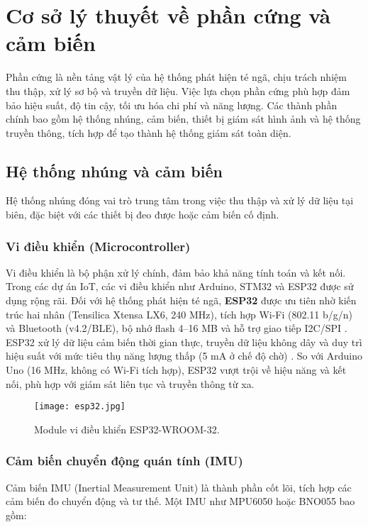 \section{Cơ sở lý thuyết về phần cứng và cảm biến}

Phần cứng là nền tảng vật lý của hệ thống phát hiện té ngã, chịu trách nhiệm thu thập, xử lý sơ bộ và truyền dữ liệu. Việc lựa chọn phần cứng phù hợp đảm bảo hiệu suất, độ tin cậy, tối ưu hóa chi phí và năng lượng. Các thành phần chính bao gồm hệ thống nhúng, cảm biến, thiết bị giám sát hình ảnh và hệ thống truyền thông, tích hợp để tạo thành hệ thống giám sát toàn diện.

\subsection{Hệ thống nhúng và cảm biến}

Hệ thống nhúng đóng vai trò trung tâm trong việc thu thập và xử lý dữ liệu tại biên, đặc biệt với các thiết bị đeo được hoặc cảm biến cố định.

\subsubsection{Vi điều khiển (Microcontroller)}
Vi điều khiển là bộ phận xử lý chính, đảm bảo khả năng tính toán và kết nối. Trong các dự án IoT, các vi điều khiển như Arduino, STM32 và ESP32 được sử dụng rộng rãi. Đối với hệ thống phát hiện té ngã, \textbf{ESP32} được ưu tiên nhờ kiến trúc hai nhân (Tensilica Xtensa LX6, 240 MHz), tích hợp Wi-Fi (802.11 b/g/n) và Bluetooth (v4.2/BLE), bộ nhớ flash 4--16 MB và hỗ trợ giao tiếp I2C/SPI \cite{esp32datasheet2023}. ESP32 xử lý dữ liệu cảm biến thời gian thực, truyền dữ liệu không dây và duy trì hiệu suất với mức tiêu thụ năng lượng thấp (5 mA ở chế độ chờ) \cite{iotproject2024}. So với Arduino Uno (16 MHz, không có Wi-Fi tích hợp), ESP32 vượt trội về hiệu năng và kết nối, phù hợp với giám sát liên tục và truyền thông từ xa.

\begin{figure}[ht]
    \centering
    \texttt{[image: esp32.jpg]}
    \caption{Module vi điều khiển ESP32-WROOM-32.}
    \label{fig:esp32}
\end{figure}

\subsubsection{Cảm biến chuyển động quán tính (IMU)}
Cảm biến IMU (Inertial Measurement Unit) là thành phần cốt lõi, tích hợp các cảm biến đo chuyển động và tư thế. Một IMU như MPU6050 hoặc BNO055 bao gồm:

